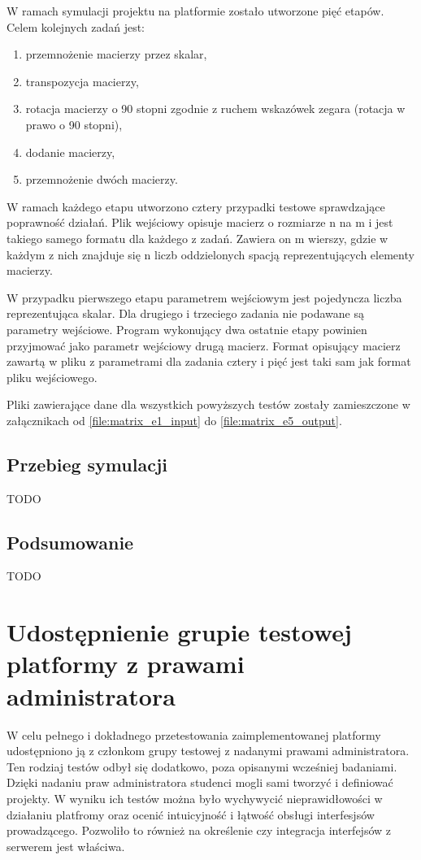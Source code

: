 W ramach symulacji projektu na platformie zostało utworzone pięć etapów.
Celem kolejnych zadań jest:
\begin{enumerate}
    \item przemnożenie macierzy przez skalar,
    \item transpozycja macierzy,
    \item rotacja macierzy o 90 stopni zgodnie z ruchem wskazówek zegara (rotacja w prawo o 90 stopni),
    \item dodanie macierzy,
    \item przemnożenie dwóch macierzy.
\end{enumerate}

W ramach każdego etapu utworzono cztery przypadki testowe sprawdzające poprawność działań.
Plik wejściowy opisuje macierz o rozmiarze n na m i jest takiego samego formatu dla każdego z zadań.
Zawiera on m wierszy, gdzie w każdym z nich znajduje się n liczb oddzielonych spacją reprezentujących elementy macierzy.

W przypadku pierwszego etapu parametrem wejściowym jest pojedyncza liczba reprezentująca skalar.
Dla drugiego i trzeciego zadania nie podawane są parametry wejściowe.
Program wykonujący dwa ostatnie etapy powinien przyjmować jako parametr wejściowy drugą macierz.
Format opisujący macierz zawartą w pliku z parametrami dla zadania cztery i pięć jest taki sam jak format pliku wejściowego.

Pliki zawierające dane dla wszystkich powyższych testów zostały zamieszczone w załącznikach od \ref{file:matrix_e1_input} do \ref{file:matrix_e5_output}.


\subsection{Przebieg symulacji}
\label{matrix_simulation}

TODO


\subsection{Podsumowanie}

TODO


\section{Udostępnienie grupie testowej platformy z prawami administratora}

W celu pełnego i dokładnego przetestowania zaimplementowanej platformy udostępniono ją z członkom grupy testowej z nadanymi prawami administratora.
Ten rodziaj testów odbył się dodatkowo, poza opisanymi wcześniej badaniami.
Dzięki nadaniu praw administratora studenci mogli sami tworzyć i definiować projekty.
W wyniku ich testów można było wychywycić nieprawidłowości w działaniu platfromy oraz ocenić intuicyjność i łątwość obsługi interfesjsów prowadzącego.
Pozwoliło to również na określenie czy integracja interfejsów z serwerem jest właściwa.

